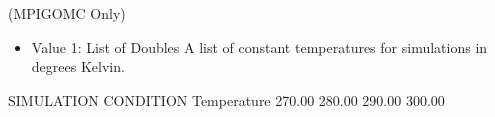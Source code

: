 \documentclass[letterpaper,10pt,english]{sphinxmanual}
\begin{document}
\begin{description}
\sphinxAtStartPar
(MPI\sphinxhyphen{}GOMC Only)
\begin{itemize}
\item {} 
\sphinxAtStartPar
Value 1: List of Doubles \sphinxhyphen{} A list of constant temperatures for simulations in degrees Kelvin.

\end{itemize}

\begin{sphinxVerbatim}[commandchars=\\\{\}]
\PYGZsh{}\PYGZsh{}\PYGZsh{}\PYGZsh{}\PYGZsh{}\PYGZsh{}\PYGZsh{}\PYGZsh{}\PYGZsh{}\PYGZsh{}\PYGZsh{}\PYGZsh{}\PYGZsh{}\PYGZsh{}\PYGZsh{}\PYGZsh{}\PYGZsh{}\PYGZsh{}\PYGZsh{}\PYGZsh{}\PYGZsh{}\PYGZsh{}\PYGZsh{}\PYGZsh{}\PYGZsh{}\PYGZsh{}\PYGZsh{}\PYGZsh{}\PYGZsh{}\PYGZsh{}\PYGZsh{}\PYGZsh{}\PYGZsh{}
\PYGZsh{} SIMULATION CONDITION
\PYGZsh{}\PYGZsh{}\PYGZsh{}\PYGZsh{}\PYGZsh{}\PYGZsh{}\PYGZsh{}\PYGZsh{}\PYGZsh{}\PYGZsh{}\PYGZsh{}\PYGZsh{}\PYGZsh{}\PYGZsh{}\PYGZsh{}\PYGZsh{}\PYGZsh{}\PYGZsh{}\PYGZsh{}\PYGZsh{}\PYGZsh{}\PYGZsh{}\PYGZsh{}\PYGZsh{}\PYGZsh{}\PYGZsh{}\PYGZsh{}\PYGZsh{}\PYGZsh{}\PYGZsh{}\PYGZsh{}\PYGZsh{}\PYGZsh{}
Temperature   270.00    280.00    290.00    300.00
\end{sphinxVerbatim}

\end{description}
\end{document}
